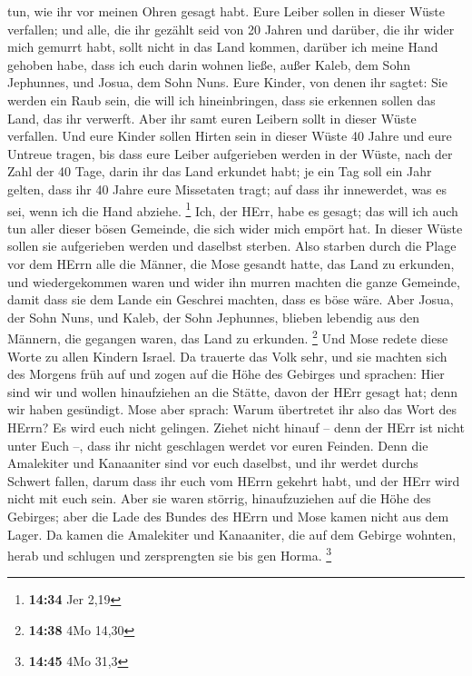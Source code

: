 tun, wie ihr vor meinen Ohren gesagt habt.  Eure Leiber
sollen in dieser Wüste verfallen; und alle, die ihr gezählt seid von 20
Jahren und darüber, die ihr wider mich gemurrt habt,  sollt
nicht in das Land kommen, darüber ich meine Hand gehoben habe, dass ich
euch darin wohnen ließe, außer Kaleb, dem Sohn Jephunnes, und Josua, dem
Sohn Nuns.  Eure Kinder, von denen ihr sagtet: Sie werden
ein Raub sein, die will ich hineinbringen, dass sie erkennen sollen das
Land, das ihr verwerft.  Aber ihr samt euren Leibern sollt
in dieser Wüste verfallen.  Und eure Kinder sollen Hirten
sein in dieser Wüste 40 Jahre und eure Untreue tragen, bis dass eure
Leiber aufgerieben werden in der Wüste,  nach der Zahl der
40 Tage, darin ihr das Land erkundet habt; je ein Tag soll ein Jahr
gelten, dass ihr 40 Jahre eure Missetaten tragt; auf dass ihr
innewerdet, was es sei, wenn ich die Hand abziehe. \footnote{\textbf{14:34}
  Jer 2,19}  Ich, der HErr, habe es gesagt; das will ich
auch tun aller dieser bösen Gemeinde, die sich wider mich empört hat. In
dieser Wüste sollen sie aufgerieben werden und daselbst sterben.
 Also starben durch die Plage vor dem HErrn alle die
Männer, die Mose gesandt hatte, das Land zu erkunden, und wiedergekommen
waren und wider ihn murren machten die ganze Gemeinde, 
damit dass sie dem Lande ein Geschrei machten, dass es böse wäre.
 Aber Josua, der Sohn Nuns, und Kaleb, der Sohn Jephunnes,
blieben lebendig aus den Männern, die gegangen waren, das Land zu
erkunden. \footnote{\textbf{14:38} 4Mo 14,30}  Und Mose
redete diese Worte zu allen Kindern Israel. Da trauerte das Volk sehr,
 und sie machten sich des Morgens früh auf und zogen auf
die Höhe des Gebirges und sprachen: Hier sind wir und wollen
hinaufziehen an die Stätte, davon der HErr gesagt hat; denn wir haben
gesündigt.  Mose aber sprach: Warum übertretet ihr also das
Wort des HErrn? Es wird euch nicht gelingen.  Ziehet nicht
hinauf -- denn der HErr ist nicht unter Euch --, dass ihr nicht
geschlagen werdet vor euren Feinden.  Denn die Amalekiter
und Kanaaniter sind vor euch daselbst, und ihr werdet durchs Schwert
fallen, darum dass ihr euch vom HErrn gekehrt habt, und der HErr wird
nicht mit euch sein.  Aber sie waren störrig,
hinaufzuziehen auf die Höhe des Gebirges; aber die Lade des Bundes des
HErrn und Mose kamen nicht aus dem Lager.  Da kamen die
Amalekiter und Kanaaniter, die auf dem Gebirge wohnten, herab und
schlugen und zersprengten sie bis gen Horma. \footnote{\textbf{14:45}
  4Mo 31,3}


